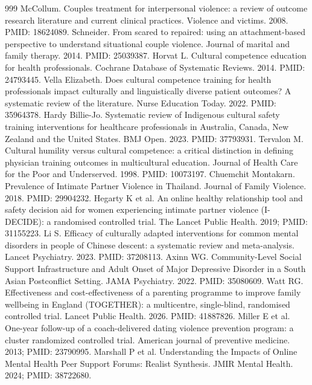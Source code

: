 \documentclass[11pt]{article}
\begin{document}
\begin{thebibliography}{999}
 McCollum. Couples treatment for interpersonal violence: a review of outcome research literature and current clinical practices. Violence and victims. 2008. PMID: 18624089.
 Schneider. From scared to repaired: using an attachment-based perspective to understand situational couple violence. Journal of marital and family therapy. 2014. PMID: 25039387.
 Horvat L. Cultural competence education for health professionals. Cochrane Database of Systematic Reviews. 2014. PMID: 24793445.
 Vella Elizabeth. Does cultural competence training for health professionals impact culturally and linguistically diverse patient outcomes? A systematic review of the literature. Nurse Education Today. 2022. PMID: 35964378.
 Hardy Billie-Jo. Systematic review of Indigenous cultural safety training interventions for healthcare professionals in Australia, Canada, New Zealand and the United States. BMJ Open. 2023. PMID: 37793931.
 Tervalon M. Cultural humility versus cultural competence: a critical distinction in defining physician training outcomes in multicultural education. Journal of Health Care for the Poor and Underserved. 1998. PMID: 10073197.
 Chuemchit Montakarn. Prevalence of Intimate Partner Violence in Thailand. Journal of Family Violence. 2018. PMID: 29904232.
 Hegarty K et al. An online healthy relationship tool and safety decision aid for women experiencing intimate partner violence (I-DECIDE): a randomised controlled trial. The Lancet Public Health. 2019; PMID: 31155223.
 Li S. Efficacy of culturally adapted interventions for common mental disorders in people of Chinese descent: a systematic review and meta-analysis. Lancet Psychiatry. 2023. PMID: 37208113.
 Axinn WG. Community-Level Social Support Infrastructure and Adult Onset of Major Depressive Disorder in a South Asian Postconflict Setting. JAMA Psychiatry. 2022. PMID: 35080609.
 Watt RG. Effectiveness and cost-effectiveness of a parenting programme to improve family wellbeing in England (TOGETHER): a multicentre, single-blind, randomised controlled trial. Lancet Public Health. 2026. PMID: 41887826.
 Miller E et al. One-year follow-up of a coach-delivered dating violence prevention program: a cluster randomized controlled trial. American journal of preventive medicine. 2013; PMID: 23790995.
 Marshall P et al. Understanding the Impacts of Online Mental Health Peer Support Forums: Realist Synthesis. JMIR Mental Health. 2024; PMID: 38722680.

\end{thebibliography}
\end{document}
